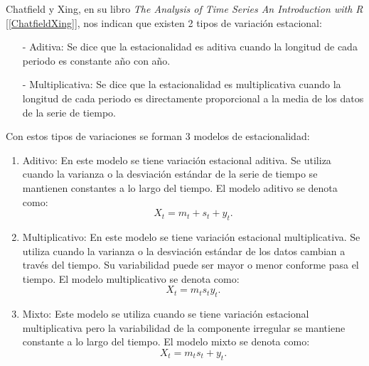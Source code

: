 Chatfield y Xing, en su libro \textit{The Analysis of Time Series An Introduction with R} [\ref{ChatfieldXing}], nos indican que existen 2 tipos de variación estacional:
  
  \begin{itemize}
\item[-] Aditiva: Se dice que la estacionalidad es aditiva cuando la longitud de cada periodo es constante año con año.

\item[-] Multiplicativa: Se dice que la estacionalidad es multiplicativa cuando la longitud de cada periodo es directamente proporcional a la media de los datos de la serie de tiempo.
\end{itemize}

Con estos tipos de variaciones se forman 3 modelos de estacionalidad:


  \begin{enumerate}
\item Aditivo: En este modelo se tiene variación estacional aditiva. Se utiliza cuando la varianza o la desviación estándar de la serie de tiempo se mantienen constantes a lo largo del tiempo. El modelo aditivo se denota como:
\begin{equation}
X_{t} = m_{t} + s_{t} + y_{t}.
\end{equation}

\item Multiplicativo: En este modelo se tiene variación estacional multiplicativa. Se utiliza cuando la varianza o la desviación estándar de los datos cambian a través del tiempo. Su variabilidad puede ser mayor o menor conforme pasa el tiempo. El modelo multiplicativo se denota como:
\begin{equation}
X_{t} = m_{t}s_{t}y_{t}.
\end{equation}

\item Mixto: Este modelo se utiliza cuando se tiene variación estacional multiplicativa pero la variabilidad de la componente irregular se mantiene constante a lo largo del tiempo. El modelo mixto se denota como:
\begin{equation}
X_{t} = m_{t}s_{t} + y_{t}.
\end{equation}
\end{enumerate}

